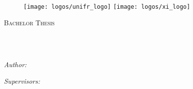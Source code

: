 

\begin{titlepage}
\begin{center}


\begin{figure}
  \centering
    \texttt{[image: logos/unifr\_logo]}
  \hfill
    \texttt{[image: logos/xi\_logo]}
  \vspace{30mm}
\end{figure}

{\scshape\LARGE \univname\par}\vspace{1.5cm} %
\textsc{\Large Bachelor Thesis}\\[0.5cm] %
\HRule \\[0.4cm] %
{\huge \bfseries \ttitle\par}\vspace{0.4cm} %
\HRule \\[1.5cm] %

\begin{minipage}[t]{0.4\textwidth}
\begin{flushleft} \large
\emph{Author:}\\
\href{mailto://christophe.broillet@unifr.ch}{\authorname} %
\end{flushleft}
\end{minipage}
\begin{minipage}[t]{0.4\textwidth}
\begin{flushright} \large
\emph{Supervisors:} \\
\href{https://exascale.info/members/giuseppe-cuccu/}{\cosupname} \\ %
\href{https://exascale.info/phil}{\supname} %
\end{flushright}
\end{minipage}\\[1cm]


\end{center}
\end{titlepage}

